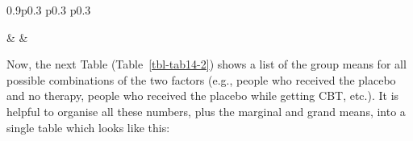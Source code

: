 \documentclass[
  a4paper,
]{book}
\begin{document}
\begin{table}[ht]
\begin{centerbox}
\begin{threeparttable}
\begin{tabularx}{0.9\textwidth}{p{} p{} p{}}
\hhline{}

 &
 &
 \tabularnewline[-0.5pt]


\end{tabularx} 

\end{threeparttable}\par\end{centerbox}

\end{table}
 

Now, the next Table (Table~\ref{tbl-tab14-2}) shows a list of the group
means for all possible combinations of the two factors (e.g., people who
received the placebo and no therapy, people who received the placebo
while getting CBT, etc.). It is helpful to organise all these numbers,
plus the marginal and grand means, into a single table which looks like
this:

\hypertarget{tbl-tab14-2}{}
 
  \providecommand{\huxb}[2]{\arrayrulecolor[RGB]{#1}\global\arrayrulewidth=#2pt}
  \providecommand{\huxvb}[2]{\color[RGB]{#1}\vrule width #2pt}
  \providecommand{\huxtpad}[1]{\rule{0pt}{#1}}
  \providecommand{\huxbpad}[1]{\rule[-#1]{0pt}{#1}}
\end{document}
